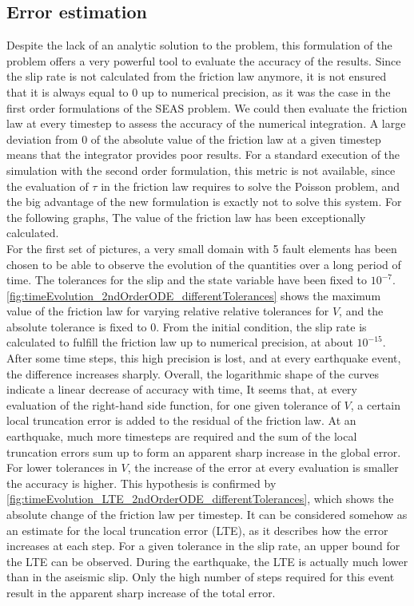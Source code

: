 \subsection{Error estimation}
Despite the lack of an analytic solution to the problem, this formulation of the problem offers a very powerful tool to evaluate the accuracy of the results. Since the slip rate is not calculated from the friction law anymore, it is not ensured that it is always equal to 0 up to numerical precision, as it was the case in the first order formulations of the SEAS problem. We could then evaluate the friction law at every timestep to assess the accuracy of the numerical integration. A large deviation from 0 of the absolute value of the friction law at a given timestep means that the integrator provides poor results. For a standard execution of the simulation with the second order formulation, this metric is not available, since the evaluation of $\tau$ in the friction law requires to solve the Poisson problem, and the big advantage of the new formulation is exactly not to solve this system. For the following graphs, The value of the friction law has been exceptionally calculated. \\

For the first set of pictures, a very small domain with 5 fault elements has been chosen to be able to observe the evolution of the quantities over a long period of time. The tolerances for the slip and the state variable have been fixed to $10^{-7}$. \autoref{fig:timeEvolution_2ndOrderODE_differentTolerances} shows the maximum value of the friction law for varying relative relative tolerances for $V$, and the absolute tolerance is fixed to 0. From the initial condition, the slip rate is calculated to fulfill the friction law up to numerical precision, at about $10^{-15}$. After some time steps, this high precision is lost, and at every earthquake event, the difference increases sharply. Overall, the logarithmic shape of the curves indicate a linear decrease of accuracy with time, It seems that, at every evaluation of the right-hand side function, for one given tolerance of $V$, a certain local truncation error is added to the residual of the friction law. At an earthquake, much more timesteps are required and the sum of the local truncation errors sum up to form an apparent sharp increase in the global error. For lower tolerances in $V$, the increase of the error at every evaluation is smaller the accuracy is higher. This hypothesis is confirmed by \autoref{fig:timeEvolution_LTE_2ndOrderODE_differentTolerances}, which shows the absolute change of the friction law per timestep. It can be considered somehow as an estimate for the local truncation error (LTE), as it describes how the error increases at each step. For a given tolerance in the slip rate, an upper bound for the LTE can be observed. During the earthquake, the LTE is actually much lower than in the aseismic slip. Only the high number of steps required for this event result in the apparent sharp increase of the total error. 

